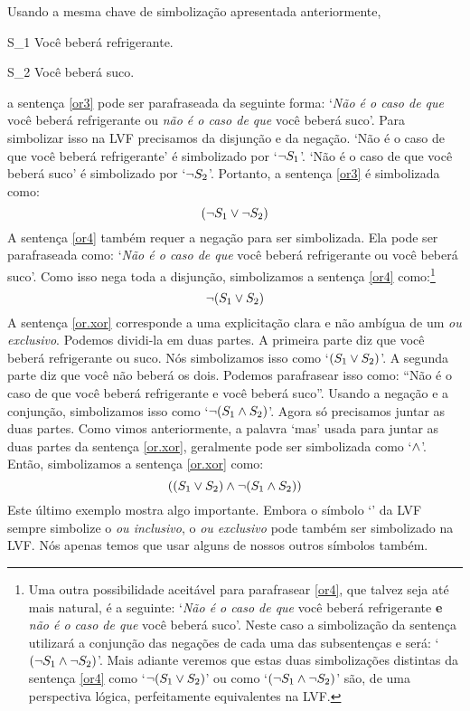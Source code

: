 Usando a mesma chave de simbolização apresentada anteriormente,
	\begin{ekey}
		\item[S_1] Você beberá refrigerante.
		\item[S_2] Você beberá suco.
	\end{ekey}
a sentença \ref{or3} pode ser parafraseada da seguinte forma:
`\emph{Não é o caso de que} você beberá refrigerante ou \emph{não é o caso de que} você beberá suco'.
Para simbolizar isso na LVF precisamos da disjunção e da negação.
`Não é o caso de que você beberá refrigerante' é simbolizado por `$\neg S_1$'. `Não é o caso de que você beberá suco' é simbolizado por `$\neg S_2$'. Portanto, a sentença \ref{or3} é simbolizada como:
$$(\neg S_1 \vee \neg S_2)$$
A sentença \ref{or4} também requer a negação para ser simbolizada.
Ela pode ser parafraseada como:
`\emph{Não é o caso de que} você beberá refrigerante ou você beberá suco'.
Como isso nega toda a disjunção, simbolizamos a sentença \ref{or4} como:\footnote{
	Uma outra possibilidade aceitável para parafrasear \ref{or4}, que talvez seja até mais natural, é a seguinte:
	`\emph{Não é o caso de que} você beberá refrigerante \textbf{e} \emph{não é o caso de que} você beberá suco'. Neste caso a simbolização da sentença utilizará a conjunção das negações de cada uma das subsentenças e será: `$(\neg S_1 \wedge \neg S_2)$'.
	Mais adiante veremos que estas duas simbolizações distintas da sentença \ref{or4} como `$\neg(S_1 \vee S_2)$' ou como `$(\neg S_1 \wedge \neg S_2)$' são, de uma perspectiva lógica, perfeitamente equivalentes na LVF.}
$$\neg(S_1 \vee S_2)$$
A sentença \ref{or.xor} corresponde a uma explicitação clara e não ambígua de um \emph{ou exclusivo}. 
Podemos dividi-la em duas partes.
A primeira parte diz que você beberá refrigerante ou suco.
Nós simbolizamos isso como `$(S_1 \vee S_2)$'.
A segunda parte diz que você não beberá os dois.
Podemos parafrasear isso como:
``Não é o caso de que você beberá refrigerante e você beberá suco''.
Usando a negação e a conjunção, simbolizamos isso como `$\neg(S_1 \wedge S_2)$'.
Agora só precisamos juntar as duas partes.
Como vimos anteriormente, a palavra `mas' usada para juntar as duas partes da sentença \ref{or.xor}, geralmente pode ser simbolizada como `$\wedge$'.
Então, simbolizamos a sentença \ref{or.xor} como:
$$((S_1 \vee S_2) \wedge \neg (S_1 \wedge S_2))$$
Este último exemplo mostra algo importante.
Embora o símbolo `\eor' da LVF sempre simbolize o \emph{ou inclusivo}, o \emph{ou exclusivo} pode também ser simbolizado na LVF.
Nós apenas temos que usar alguns de nossos outros símbolos também.




